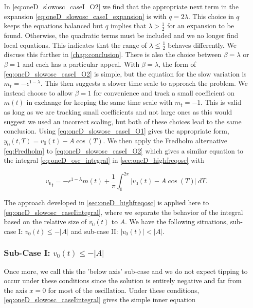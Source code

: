 \indent In \eqref{eq:oneD_slowosc_caseI_O2} we find that the appropriate next term in the expansion \eqref{eq:oneD_slowosc_caseI_expansion} is with $q=2\lambda$. This choice in $q$ keeps the equations balanced but $q$ implies that $\lambda> \frac{1}{2}$ for an expansion to be found. Otherwise, the quadratic terms must be included and we no longer find local equations. This indicates that the range of $\lambda\le\frac{1}{2}$ behaves differently. We discuss this further in \autoref{chap:conclusion}. There is also the choice between $\beta=\lambda$ or $\beta=1$ and each has a particular appeal. With $\beta=\lambda$, the form of \eqref{eq:oneD_slowosc_caseI_O2} is simple, but the equation for the slow variation is $m_t=-\epsilon^{1-\lambda}$. This then suggests a slower time scale to approach the problem. We instead choose to allow $\beta=1$ for convenience and track a small coefficient on $m(t)$ in exchange for keeping the same time scale with $m_t=-1$. This is valid as long as we are tracking small coefficients and not large ones as this would suggest we used an incorrect scaling, but both of these choices lead to the same conclusion. Using \eqref{eq:oneD_slowosc_caseI_O1} gives the appropriate form, $y_0(t,T)=v_0(t)-A\cos(T)$. We then apply the Fredholm alternative \eqref{eq:Fredholm} to \eqref{eq:oneD_slowosc_caseI_O2} which gives a similar equation to the integral \eqref{eq:oneD_osc_integral} in \autoref{sec:oneD_highfreqosc} with

\begin{equation}\label{eq:oneD_slowosc_caseIintegral}
{v_0}_t = -\epsilon^{1-\lambda}m(t)+\frac{1}{\pi}\int_0^{2\pi} |v_0(t)-A\cos(T)|\,dT.
\end{equation}

The approach developed in \autoref{sec:oneD_highfreqosc} is applied here to \eqref{eq:oneD_slowosc_caseIintegral}, where we separate the behavior of the integral based on the relative size of $v_0(t)$ to $A$. We have the following situations, sub-case I: $v_0(t)\le -|A|$ and sub-case II: $|v_0(t)|<|A|$.

\subsubsection{Sub-Case I: $v_0(t) \le -|A|$} 
\label{subsubsec:oneD_slowosc_subcaseI}

Once more, we call this the 'below axis' sub-case and we do not expect tipping to occur under these conditions since the solution is entirely negative and far from the axis $x=0$ for most of the oscillation. Under these conditions, \eqref{eq:oneD_slowosc_caseIintegral} gives the simple inner equation

